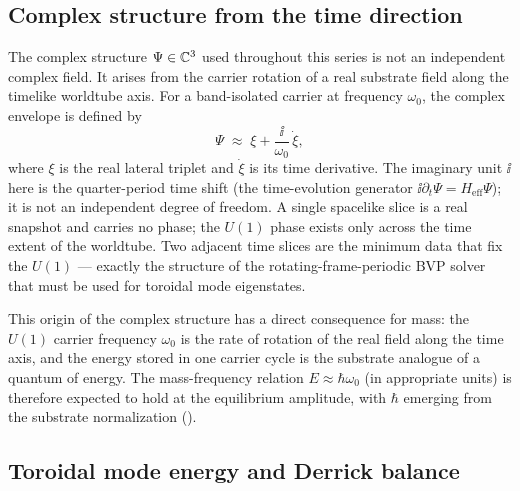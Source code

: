 \subsection{Complex structure from the time direction}
\label{subsec:complex-from-time}

The complex structure $\Psi\in\mathbb{C}^3$ used throughout this series is not an independent complex
field.
It arises from the carrier rotation of a real substrate field along the timelike worldtube axis.
For a band-isolated carrier at frequency $\omega_0$, the complex envelope is defined by
\begin{equation}
  \Psi \;\approx\; \xi + \frac{\ii}{\omega_0}\,\dot\xi,
  \label{eq:complex-from-time}
\end{equation}
where $\xi$ is the real lateral triplet and $\dot\xi$ is its time derivative.
The imaginary unit $\ii$ here is the quarter-period time shift (the time-evolution generator
$\ii\partial_t\Psi = H_{\mathrm{eff}}\Psi$); it is not an independent degree of freedom.
A single spacelike slice is a real snapshot and carries no phase; the $U(1)$ phase exists only
across the time extent of the worldtube.
Two adjacent time slices are the minimum data that fix the $U(1)$ --- exactly the structure of the
rotating-frame-periodic BVP solver that must be used for toroidal mode eigenstates.

This origin of the complex structure has a direct consequence for mass: the $U(1)$ carrier
frequency $\omega_0$ is the rate of rotation of the real field along the time axis, and the
energy stored in one carrier cycle is the substrate analogue of a quantum of energy.
The mass-frequency relation $E\approx\hbar\omega_0$ (in appropriate units) is therefore expected
to hold at the equilibrium amplitude, with $\hbar$ emerging from the substrate normalization
().

\subsection{Toroidal mode energy and Derrick balance}
\label{subsec:toroidal-derrick}

